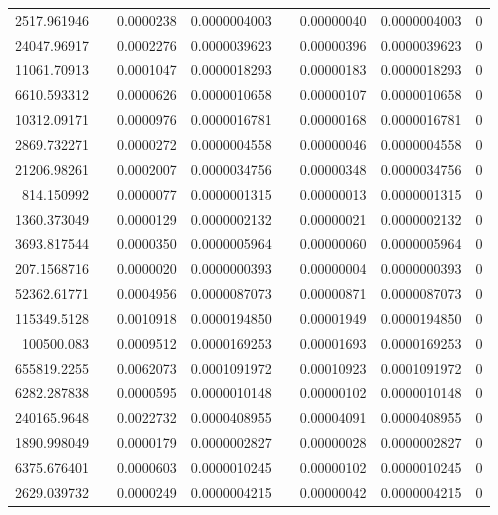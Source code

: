 \documentclass[
journal=jacsat, %
manuscript=article]{achemso}
\begin{document}
\begin{table}[htbp]
{\begin{tabular}{rrrrrrrr}
    2517.961946 &       & 0.0000238 & 0.0000004003 &       & 0.00000040 & 0.0000004003 & 0 \\
    24047.96917 &       & 0.0002276 & 0.0000039623 &       & 0.00000396 & 0.0000039623 & 0 \\
    11061.70913 &       & 0.0001047 & 0.0000018293 &       & 0.00000183 & 0.0000018293 & 0 \\
    6610.593312 &       & 0.0000626 & 0.0000010658 &       & 0.00000107 & 0.0000010658 & 0 \\
    10312.09171 &       & 0.0000976 & 0.0000016781 &       & 0.00000168 & 0.0000016781 & 0 \\
    2869.732271 &       & 0.0000272 & 0.0000004558 &       & 0.00000046 & 0.0000004558 & 0 \\
    21206.98261 &       & 0.0002007 & 0.0000034756 &       & 0.00000348 & 0.0000034756 & 0 \\
    814.150992 &       & 0.0000077 & 0.0000001315 &       & 0.00000013 & 0.0000001315 & 0 \\
    1360.373049 &       & 0.0000129 & 0.0000002132 &       & 0.00000021 & 0.0000002132 & 0 \\
    3693.817544 &       & 0.0000350 & 0.0000005964 &       & 0.00000060 & 0.0000005964 & 0 \\
    207.1568716 &       & 0.0000020 & 0.0000000393 &       & 0.00000004 & 0.0000000393 & 0 \\
    52362.61771 &       & 0.0004956 & 0.0000087073 &       & 0.00000871 & 0.0000087073 & 0 \\
    115349.5128 &       & 0.0010918 & 0.0000194850 &       & 0.00001949 & 0.0000194850 & 0 \\
    100500.083 &       & 0.0009512 & 0.0000169253 &       & 0.00001693 & 0.0000169253 & 0 \\
    655819.2255 &       & 0.0062073 & 0.0001091972 &       & 0.00010923 & 0.0001091972 & 0 \\
    6282.287838 &       & 0.0000595 & 0.0000010148 &       & 0.00000102 & 0.0000010148 & 0 \\
    240165.9648 &       & 0.0022732 & 0.0000408955 &       & 0.00004091 & 0.0000408955 & 0 \\
    1890.998049 &       & 0.0000179 & 0.0000002827 &       & 0.00000028 & 0.0000002827 & 0 \\
    6375.676401 &       & 0.0000603 & 0.0000010245 &       & 0.00000102 & 0.0000010245 & 0 \\
    2629.039732 &       & 0.0000249 & 0.0000004215 &       & 0.00000042 & 0.0000004215 & 0 \\

\end{tabular}}
\end{table}
\end{document}
